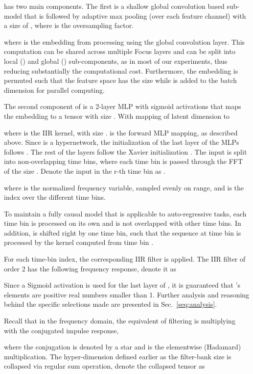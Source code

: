 \documentclass[11pt]{article}
\begin{document}
 has two main components. The first is a shallow global convolution \cite{fu2023simple} based sub-model that is followed by adaptive max pooling (over each feature channel) \cite{Pytorch} with a size of , where  is the oversampling factor.

where  is the embedding from processing  using the global convolution layer. 
This computation can be shared across multiple Focus layers and can be split into local () and global () sub-components, as in most of our experiments, thus reducing substantially the computational cost. Furthermore, the embedding is permuted such that the feature space has the size  while  is added to the batch dimension for parallel computing.

The second component of  is a 2-layer MLP with sigmoid activations that maps the embedding  to a tensor with size .
With mapping of latent dimension  to 

where  is the IIR kernel, with size .  is the forward MLP mapping, as described above. Since  is a hypernetwork, the initialization of the last layer of the MLPs follows \cite{Chang2020Principled}. The rest of the layers follow the Xavier initialization \cite{pmlr-v9-glorot10a}.
The input  is split into non-overlapping time bins, where each time bin is passed through the FFT of the size . Denote the input in the r-th time bin as .

where  is the normalized frequency variable, sampled evenly on  range, and  is the index over the different time bins.

 To maintain a fully causal model that is applicable to auto-regressive tasks, each time bin is processed on its own and is not overlapped with other time bins.
In addition,   is shifted right by one time bin, such that the sequence at time bin  is processed by the kernel computed from time bin .

For each time-bin index, the corresponding IIR filter is applied. 
The IIR  filter of order 2 has the following frequency response, denote it as  


Since a Sigmoid activation is used for the last layer of , it is guaranteed that 's elements are positive real numbers smaller than 1. 
Further analysis and reasoning behind the specific selections made are presented in Sec.~\ref{seq:analysis}.

Recall that in the frequency domain, the equivalent of filtering is multiplying with the conjugated impulse response,

where the conjugation is denoted by a star and  is the elementwise (Hadamard) multiplication.
The hyper-dimension  defined earlier as the filter-bank size is collapsed via regular sum operation, denote the collapsed tensor as 
\end{document}
